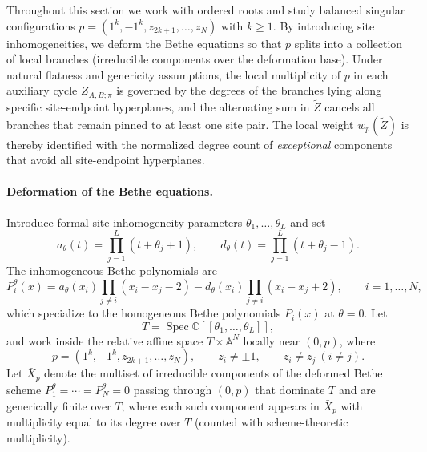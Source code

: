 \documentclass[11pt]{article}
\theoremstyle{definition}
\newcommand{\A}{\mathbb{A}}
\newcommand{\C}{\mathbb{C}}
\begin{document}
Throughout this section we work with ordered roots and study balanced singular configurations $p=(1^k,-1^k,z_{2k+1},\ldots,z_N)$ with $k\ge 1$. By introducing site inhomogeneities, we deform the Bethe
equations so that $p$ splits into a collection of local branches (irreducible components over the deformation base). Under natural flatness and genericity assumptions, the local
multiplicity of $p$ in each auxiliary cycle $Z_{A,B;\pi}$ is governed by the degrees of the branches lying along specific site-endpoint hyperplanes, and the alternating sum in $\tilde{Z}$ cancels all branches that remain pinned to at least one site pair. The local weight $w_p(\tilde{Z})$ is thereby identified with the normalized degree count of \emph{exceptional} components that avoid all site-endpoint hyperplanes.

\paragraph{Deformation of the Bethe equations.}
Introduce formal site inhomogeneity parameters $\theta_1,\ldots,\theta_L$ and set
\[
 a_\theta(t)=\prod_{j=1}^L(t+\theta_j+1),\qquad
 d_\theta(t)=\prod_{j=1}^L(t+\theta_j-1).
\]
The inhomogeneous Bethe polynomials are
\[
 P_i^\theta(x)=a_\theta(x_i)\prod_{j\ne i}(x_i-x_j-2)
             -d_\theta(x_i)\prod_{j\ne i}(x_i-x_j+2),\qquad i=1,\ldots,N,
\]
which specialize to the homogeneous Bethe polynomials $P_i(x)$ at $\theta=0$. Let
\[
 T=\operatorname{Spec}\C[[\theta_1,\ldots,\theta_L]],
\]
and work inside the relative affine space $T\times\A^N$ locally near $(0,p)$, where
\[
 p=(1^k,-1^k,z_{2k+1},\ldots,z_N),
 \qquad z_i\ne\pm 1,\qquad z_i\ne z_j\ (i\ne j).
\]
Let $\bar{X}_p$ denote the multiset of irreducible components of the deformed
Bethe scheme $P_1^\theta=\cdots=P_N^\theta=0$ passing through $(0,p)$ that
dominate $T$ and are generically finite over $T$, where each such component appears in $\bar{X}_p$
with multiplicity equal to its degree over $T$ (counted with scheme-theoretic multiplicity).
\end{document}
